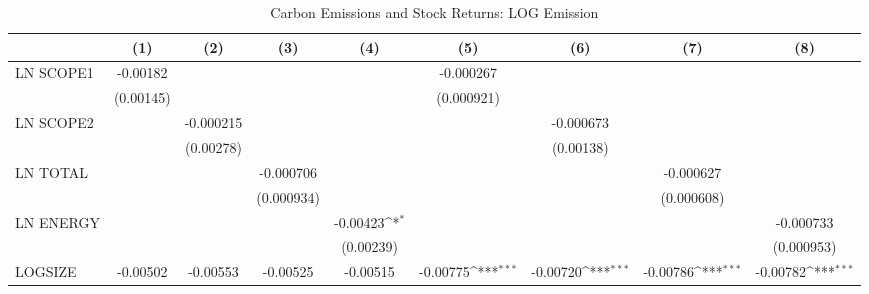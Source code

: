 \begin{table}[htbp]\centering
\def\sym#1{\ifmmode^{#1}\else\(^{#1}\)\fi}
\caption{Carbon Emissions and Stock Returns: LOG Emission}
\begin{tabular}{l*{8}{c}}
\hline\hline
                    &\multicolumn{1}{c}{(1)}         &\multicolumn{1}{c}{(2)}         &\multicolumn{1}{c}{(3)}         &\multicolumn{1}{c}{(4)}         &\multicolumn{1}{c}{(5)}         &\multicolumn{1}{c}{(6)}         &\multicolumn{1}{c}{(7)}         &\multicolumn{1}{c}{(8)}         \\
\hline
LN SCOPE1           &    -0.00182         &                     &                     &                     &   -0.000267         &                     &                     &                     \\
                    &   (0.00145)         &                     &                     &                     &  (0.000921)         &                     &                     &                     \\
LN SCOPE2           &                     &   -0.000215         &                     &                     &                     &   -0.000673         &                     &                     \\
                    &                     &   (0.00278)         &                     &                     &                     &   (0.00138)         &                     &                     \\
LN TOTAL            &                     &                     &   -0.000706         &                     &                     &                     &   -0.000627         &                     \\
                    &                     &                     &  (0.000934)         &                     &                     &                     &  (0.000608)         &                     \\
LN ENERGY           &                     &                     &                     &    -0.00423\sym{*}  &                     &                     &                     &   -0.000733         \\
                    &                     &                     &                     &   (0.00239)         &                     &                     &                     &  (0.000953)         \\
LOGSIZE             &    -0.00502         &    -0.00553         &    -0.00525         &    -0.00515         &    -0.00775\sym{***}&    -0.00720\sym{***}&    -0.00786\sym{***}&    -0.00782\sym{***}\\

\end{tabular}
\end{table}
